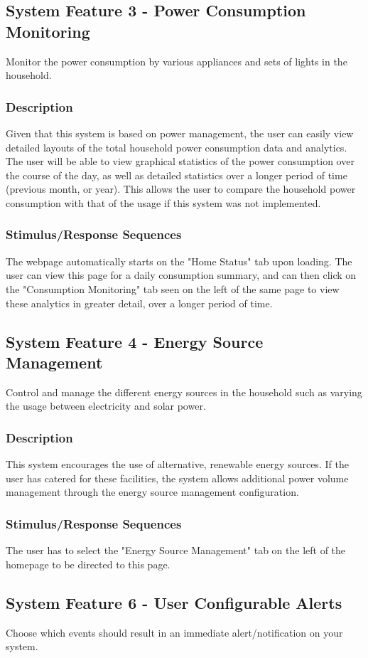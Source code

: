 \documentclass[11pt, a4paper]{article}
\begin{document}
	\subsection{System Feature 3 - Power Consumption Monitoring}
	Monitor the power consumption by various appliances and sets of lights in the household. 
	\subsubsection{Description}
	Given that this system is based on power management, the user can easily view detailed layouts of the total household power consumption data and analytics. The user will be able to view graphical statistics of the power consumption over the course of the day, as well as detailed statistics over a longer period of time (previous month, or year). This allows the user to compare the household power consumption with that of the usage if this system was not implemented. 
	\subsubsection{Stimulus/Response Sequences}
	The webpage automatically starts on the "Home Status" tab upon loading. The user can view this page for a daily consumption summary, and can then click on the "Consumption Monitoring" tab seen on the left of the same page to view these analytics in greater detail, over a longer period of time.
	\subsection{System Feature 4 - Energy Source Management}
	Control and manage the different energy sources in the household such as varying the usage between electricity and solar power. 
	\newpage
	\subsubsection{Description}
	This system encourages the use of alternative, renewable energy sources. If the user has catered for these facilities, the system allows additional power volume management through the energy source management configuration. 
	\subsubsection{Stimulus/Response Sequences}
	The user has to select the "Energy Source Management" tab on the left of the homepage to be directed to this page. 
	\subsection{System Feature 6 - User Configurable Alerts} 
	Choose which events should result in an immediate alert/notification on your system. 
\end{document}
